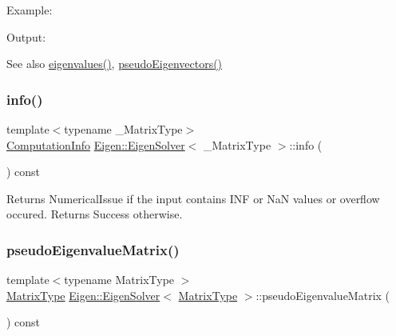 Example\+: 
\begin{DoxyCodeInclude}{0}
\end{DoxyCodeInclude}
 Output\+: 
\begin{DoxyVerbInclude}
\end{DoxyVerbInclude}


\begin{DoxySeeAlso}{See also}
\mbox{\hyperlink{class_eigen_1_1_eigen_solver_a114189009e42f5e03372a7a3dfa33b97}{eigenvalues()}}, \mbox{\hyperlink{class_eigen_1_1_eigen_solver_a4e796226f06e1f7347cf03a38755a155}{pseudo\+Eigenvectors()}} 
\end{DoxySeeAlso}
\mbox{\label{class_eigen_1_1_eigen_solver_ac4af54fadc33abcdd1778c87bfbf005b}} 
\subsubsection{\texorpdfstring{info()}{info()}}
{\footnotesize\ttfamily template$<$typename \+\_\+\+Matrix\+Type$>$ \\
\mbox{\hyperlink{group__enums_ga85fad7b87587764e5cf6b513a9e0ee5e}{Computation\+Info}} \mbox{\hyperlink{class_eigen_1_1_eigen_solver}{Eigen\+::\+Eigen\+Solver}}$<$ \+\_\+\+Matrix\+Type $>$\+::info (\begin{DoxyParamCaption}{ }\end{DoxyParamCaption}) const\hspace{0.3cm}{\ttfamily [inline]}}

\begin{DoxyReturn}{Returns}
Numerical\+Issue if the input contains I\+NF or NaN values or overflow occured. Returns Success otherwise. 
\end{DoxyReturn}
\mbox{\label{class_eigen_1_1_eigen_solver_a4979eafe0aeef06b19ada7fa5e19db17}} 
\subsubsection{\texorpdfstring{pseudoEigenvalueMatrix()}{pseudoEigenvalueMatrix()}}
{\footnotesize\ttfamily template$<$typename Matrix\+Type $>$ \\
\mbox{\hyperlink{class_eigen_1_1_eigen_solver_a83acd180404ddaac8a678fa65a6b632b}{Matrix\+Type}} \mbox{\hyperlink{class_eigen_1_1_eigen_solver}{Eigen\+::\+Eigen\+Solver}}$<$ \mbox{\hyperlink{class_eigen_1_1_eigen_solver_a83acd180404ddaac8a678fa65a6b632b}{Matrix\+Type}} $>$\+::pseudo\+Eigenvalue\+Matrix (\begin{DoxyParamCaption}{ }\end{DoxyParamCaption}) const}



